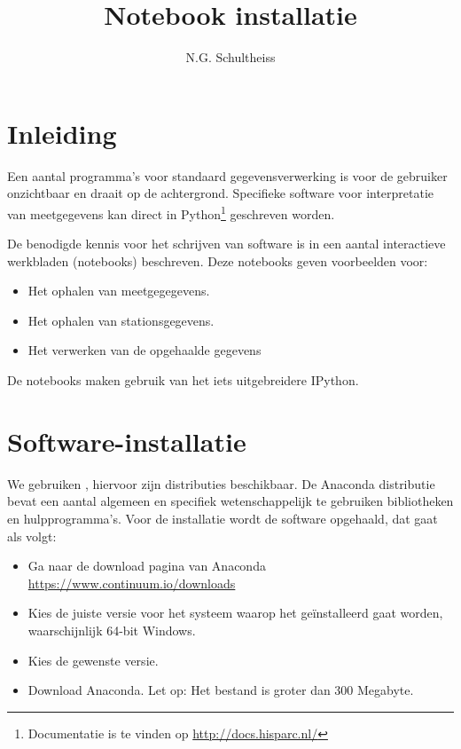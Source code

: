 

\title{Notebook installatie}
\author{N.G. Schultheiss}



\maketitle

\section{Inleiding}

Een aantal programma's voor standaard \hisparc gegevensverwerking is voor de gebruiker onzichtbaar
en draait op de achtergrond. Specifieke software voor interpretatie van meetgegevens kan direct in
Python\footnote{Documentatie is te vinden op \url{http://docs.hisparc.nl/}} geschreven worden.

De benodigde kennis voor het schrijven van \python software is in een aantal interactieve werkbladen
(notebooks) beschreven. Deze notebooks geven voorbeelden voor:
\begin{itemize}
\item Het ophalen van meetgegegevens.
\item Het ophalen van stationsgegevens.
\item Het verwerken van de opgehaalde gegevens
\end{itemize}
De notebooks maken gebruik van het iets uitgebreidere IPython.

\section{Software-installatie}

We gebruiken \python, hiervoor zijn distributies beschikbaar. De Anaconda distributie bevat een aantal algemeen en specifiek wetenschappelijk te gebruiken bibliotheken en hulpprogramma's. Voor de installatie wordt de software opgehaald, dat gaat als volgt:

\begin{itemize}
\item Ga naar de download pagina van Anaconda \url{https://www.continuum.io/downloads}
\item Kies de juiste versie voor het systeem waarop het geïnstalleerd gaat worden, waarschijnlijk 64-bit Windows.
\item Kies de gewenste \python versie.
\item Download Anaconda. Let op: Het bestand is groter dan 300 Megabyte.
\end{itemize}

